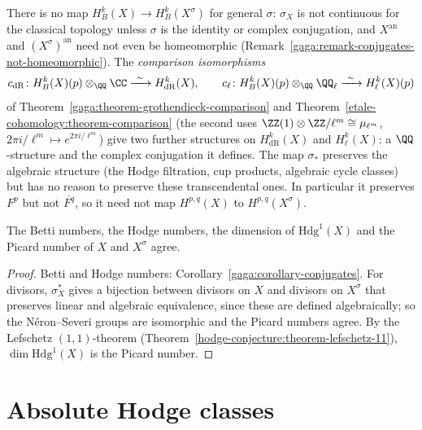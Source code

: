 \begin{remark}\label{absolute-hodge:remark-no-betti}
There is no map $H^k_B(X) \to H^k_B(X^\sigma)$ for general $\sigma$: $\sigma_X$ is not continuous for the classical topology unless $\sigma$ is the identity or complex conjugation, and
$X^{\mathrm{an}}$ and $(X^\sigma)^{\mathrm{an}}$ need not even be homeomorphic (Remark~\ref{gaga:remark-conjugates-not-homeomorphic}). The \emph{comparison isomorphisms}
\[
c_{\mathrm{dR}} \colon H^k_B(X)(p) \otimes_\QQ\CC \xrightarrow{\ \sim\ } H^k_{\mathrm{dR}}(X), \qquad c_\ell \colon H^k_B(X)(p) \otimes_\QQ\QQ_\ell \xrightarrow{\ \sim\ } H^k_\ell(X)(p)
\]
of Theorem~\ref{gaga:theorem-grothendieck-comparison} and Theorem~\ref{etale-cohomology:theorem-comparison} (the second uses $\ZZ(1) \otimes \ZZ/\ell^m \cong \mu_{\ell^m}$, $2\pi i/\ell^m \mapsto e^{2\pi i/\ell^m}$) give two
further structures on $H^k_{\mathrm{dR}}(X)$ and $H^k_\ell(X)$: a $\QQ$-structure and the complex conjugation it defines. The map $\sigma_*$ preserves the algebraic structure (the Hodge filtration,
cup products, algebraic cycle classes) but has no reason to preserve these transcendental ones. In particular it preserves $F^p$ but not $\overline{F^q}$, so it need not map $H^{p,q}(X)$ to $H^{p,q}(X^\sigma)$.
\end{remark}

\begin{proposition}\label{absolute-hodge:proposition-invariants}
The Betti numbers, the Hodge numbers, the dimension of $\mathrm{Hdg}^1(X)$ and the Picard number of $X$ and $X^\sigma$ agree.
\end{proposition}

\begin{proof}
Betti and Hodge numbers: Corollary~\ref{gaga:corollary-conjugates}. For divisors, $\sigma_X^*$ gives a bijection between divisors on $X$ and divisors on $X^\sigma$ that preserves linear and algebraic
equivalence, since these are defined algebraically; so the N\'eron--Severi groups are isomorphic and the Picard numbers agree. By the Lefschetz $(1,1)$-theorem
(Theorem~\ref{hodge-conjecture:theorem-lefschetz-11}), $\dim\mathrm{Hdg}^1(X)$ is the Picard number.
\end{proof}

\section{Absolute Hodge classes}\label{absolute-hodge:section-absolute}

